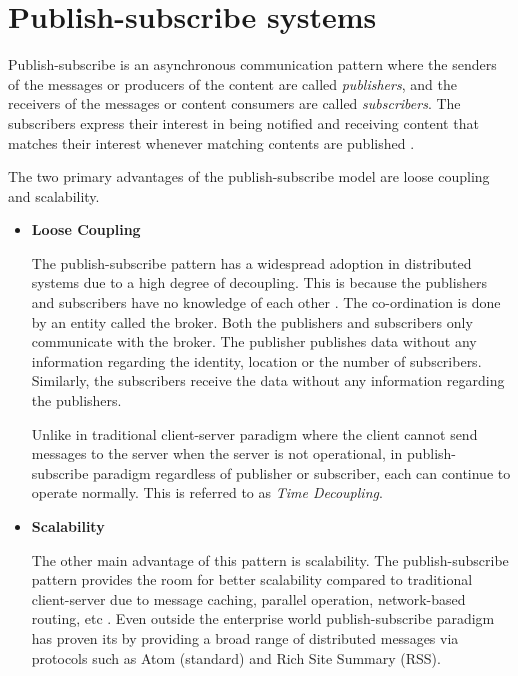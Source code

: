 \section{Publish-subscribe systems}

Publish-subscribe is an asynchronous communication pattern where the senders of the messages or producers of the content are called \textit{publishers}, and the receivers of the messages or content consumers are called \textit{subscribers}. The subscribers express their interest in being notified and receiving content that matches their interest whenever matching contents are published \parencite{Pietzuch:2002:HDE:646854.708058}.

The two primary advantages of the publish-subscribe model are loose coupling and scalability.

\begin{itemize}
\item[]\textbf{Loose Coupling}

The publish-subscribe pattern has a widespread adoption in distributed systems due to a high degree of decoupling. This is because the publishers and subscribers have no knowledge of each other \parencite{Cheung:2010:LBC:1880018.1880020}. The co-ordination is done by an entity called the broker. Both the publishers and subscribers only communicate with the broker. The publisher publishes data without any information regarding the identity, location or the number of subscribers. Similarly, the subscribers receive the data without any information regarding the publishers. 

Unlike in traditional client-server paradigm where the client cannot send messages to the server when the server is not operational, in publish-subscribe paradigm regardless of publisher or subscriber, each can continue to operate normally. This is referred to as \textit {Time Decoupling}.   

\item[]\textbf{Scalability}

The other main advantage of this pattern is scalability. The publish-subscribe pattern provides the room for better scalability compared to traditional client-server due to message caching, parallel operation, network-based routing, etc \parencite{hivemqbroker}. Even outside the enterprise world publish-subscribe paradigm has proven its by providing a broad range of distributed messages via protocols such as Atom (standard) and Rich Site Summary (RSS).

\end{itemize}

